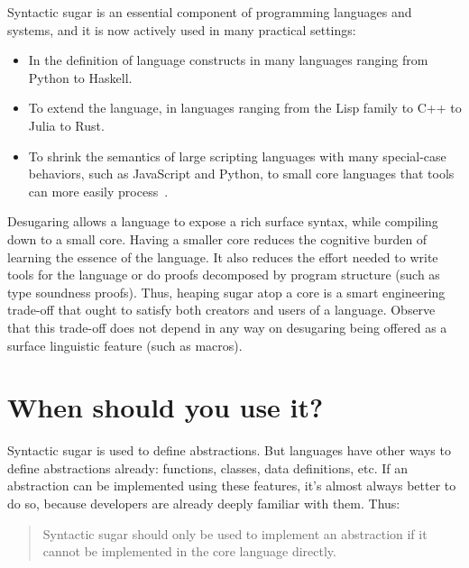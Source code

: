 Syntactic sugar is an essential component of programming languages and
systems, and it is now actively used in many practical settings:
\begin{itemize}
\item In the definition of language constructs in many languages
  ranging from Python to Haskell.
\item To extend the language, in languages ranging from the Lisp
  family to C++ to Julia to Rust.
\item To shrink the semantics of large scripting languages with many
  special-case behaviors, such as JavaScript and Python, to small core
  languages that tools can more easily process~\cite{lambda-js,politz:s5,politz:python}.
\end{itemize}
Desugaring allows a language to expose a rich surface syntax, while
compiling down to a small core. Having a smaller core reduces the
cognitive burden of learning the essence of the language. It also
reduces the effort needed to write tools for the language or do proofs
decomposed by program structure (such as type soundness proofs). Thus,
heaping sugar atop a core is a smart engineering trade-off that ought
to satisfy both creators and users of a language. Observe that this
trade-off does not depend in any way on desugaring being offered as a
surface linguistic feature (such as macros).


\section{When should you use it?}

Syntactic sugar is used to define abstractions. But languages have
other ways to define abstractions already: functions, classes, data
definitions, etc. If an abstraction can be implemented using these
features, it's almost always better to do so, because developers are
already deeply familiar with them. Thus:
\begin{quote}
  Syntactic sugar should only be used to implement an abstraction if
  it cannot be implemented in the core language directly.
\end{quote}


